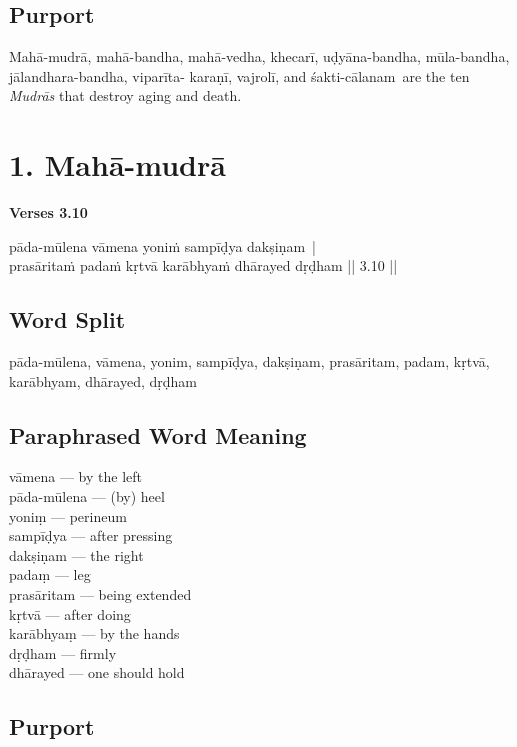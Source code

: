 \subsection*{Purport}

Mahā-mudrā,  mahā-bandha,  mahā-vedha,  khecarī, uḍyāna-bandha, mūla-bandha, jālandhara-bandha, viparīta- karaṇī, vajrolī, and  śakti-cālanam are the ten \textit{Mudrās} that destroy  aging and death.

\section*{1. Mahā-mudrā }

\noindent \textbf{Verses 3.10}

\begin{shloka}
pāda-mūlena vāmena yoniṁ sampīḍya dakṣiṇam |\\
prasāritaṁ padaṁ kṛtvā karābhyaṁ dhārayed dṛḍham || 3.10 ||
\end{shloka}

\subsection*{Word Split}

pāda-mūlena, vāmena, yonim, sampīḍya, dakṣiṇam, prasāritam, padam, kṛtvā, karābhyam, dhārayed, dṛḍham

\subsection*{Paraphrased Word Meaning}

\begin{multicols}{2}
vāmena --- by the left \\
pāda-mūlena --- (by) heel \\
yoniṃ --- perineum \\
sampīḍya --- after pressing\\
dakṣiṇam --- the right \\
padaṃ --- leg\\
prasāritam --- being extended  \\
kṛtvā --- after doing \\
karābhyaṃ --- by the hands \\
dṛḍham --- firmly \\
dhārayed --- one should hold 
\end{multicols}

\subsection*{Purport}

